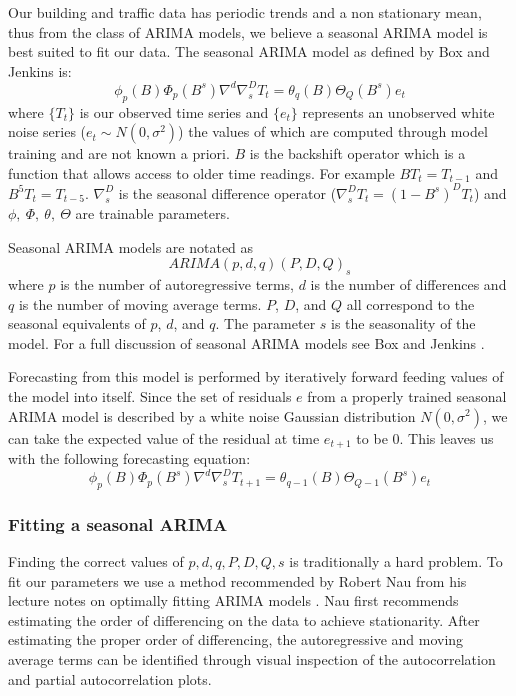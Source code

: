 Our building and traffic data has periodic trends and a non stationary mean, thus from the class of ARIMA models, we believe a seasonal ARIMA model is best suited to fit our data.  The seasonal ARIMA model as defined by Box and Jenkins \cite{Box2008} is:
\begin{equation}
\label{eq:sarima}
\phi_{p}(B)\Phi_{p}(B^{s})\nabla^{d}\nabla^{D}_{s}T_{t} = \theta_{q}(B)\Theta_{Q}(B^{s})e_{t}
\end{equation}
\noindent
where $\{T_{t}\}$ is our observed time series and $\{e_t\}$ represents an unobserved white noise series ($e_{t} \sim N(0, \sigma^{2})$) the values of which are computed through model training and are not known a priori.  $B$ is the backshift operator which is a function that allows access to older time readings.  For example $BT_{t} = T_{t-1}$ and $B^{5}T_{t} = T_{t-5}$.  $\nabla^{D}_{s}$ is the seasonal difference operator ($\nabla^{D}_{s}T_{t} = (1 - B^{s})^{D}T_{t}$) and $\phi,\  \Phi,\  \theta,\ \Theta$ are trainable parameters.

Seasonal ARIMA models are notated as
\begin{equation}
ARIMA(p,d,q)(P,D,Q)_{s}
\end{equation}
where $p$ is the number of autoregressive terms, $d$ is the number of differences and $q$ is the number of moving average terms.  $P$, $D$, and $Q$ all correspond to the seasonal equivalents of $p$, $d$, and $q$.  The parameter $s$ is the seasonality of the model.  For a full discussion of seasonal ARIMA models see Box and Jenkins \cite{Box2008}.

Forecasting from this model is performed by iteratively forward feeding values of the model into itself.  Since the set of residuals $e$ from a properly trained seasonal ARIMA model is described by a white noise Gaussian distribution $N(0, \sigma^{2})$, we can take the expected value of the residual at time $e_{t + 1}$ to be 0.  This leaves us with the following forecasting equation: 
\begin{equation}
\label{eq:sarima}
\phi_{p}(B)\Phi_{p}(B^{s})\nabla^{d}\nabla^{D}_{s}T_{t + 1} = \theta_{q - 1}(B)\Theta_{Q - 1}(B^{s})e_{t}
\end{equation}


\subsubsection{Fitting a seasonal ARIMA}

Finding the correct values of $p, d, q, P, D, Q, s$ is traditionally a hard problem.  To fit our parameters we use a method recommended by Robert Nau from his lecture notes on optimally fitting ARIMA models \cite{Nau2014}.  Nau first recommends estimating the order of differencing on the data to achieve stationarity.  After estimating the proper order of differencing, the autoregressive and moving average terms can be identified through visual inspection of the autocorrelation and partial autocorrelation plots.    

